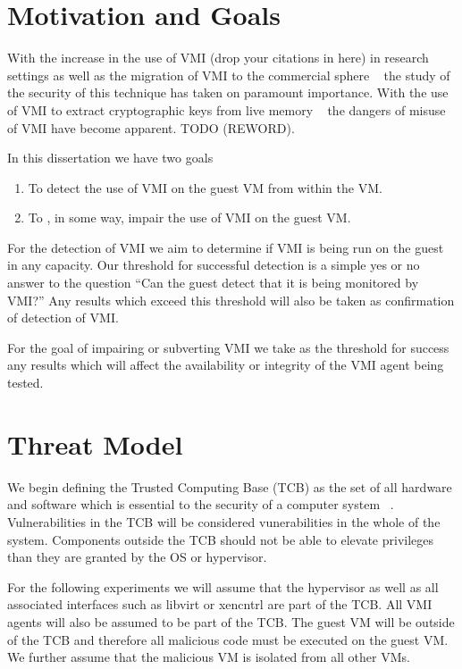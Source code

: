 
\section{Motivation and Goals}

	With the increase in the use of VMI (drop your citations in here) in research settings as well as the migration of VMI to the commercial sphere ~\cite{_vmware_2014} the study of the security of this technique has taken on paramount importance. With the use of VMI to extract cryptographic keys from live memory ~\cite{hay_circumventing_2012} the dangers of misuse of VMI have become apparent. TODO (REWORD). 

	In this dissertation we have two goals

	\begin{enumerate}
	\item To detect the use of VMI on the guest VM from within the VM. 
	\item To , in some way, impair the use of VMI on the guest VM. 
	\end{enumerate} 

	For the detection of VMI we aim to determine if VMI is being run on the guest in any capacity. Our threshold for successful detection is a simple yes or no answer to the question ``Can the guest detect that it is being monitored by VMI?'' Any results which exceed this threshold will also be taken as confirmation of detection of VMI.

For the goal of impairing or subverting VMI we take as the threshold for success any  results which will affect the availability or integrity of the VMI agent being tested. 


\section{Threat Model}
	We begin defining the Trusted Computing Base (TCB) as the set of all hardware and software which is essential to the security of a computer system ~\cite{rushby_critical_1994}. Vulnerabilities in the TCB will be considered vunerabilities in the whole of the system. Components outside the TCB should not be able to elevate privileges than they are granted by the OS or hypervisor. 

	For the following experiments we will assume that the hypervisor as well as all associated interfaces such as libvirt or xencntrl are part of the TCB. All VMI agents will also be assumed to be part of the TCB. The guest VM will be outside of the TCB and therefore all malicious code must be executed on the guest VM. We further assume that the malicious VM is isolated from all other VMs. 

